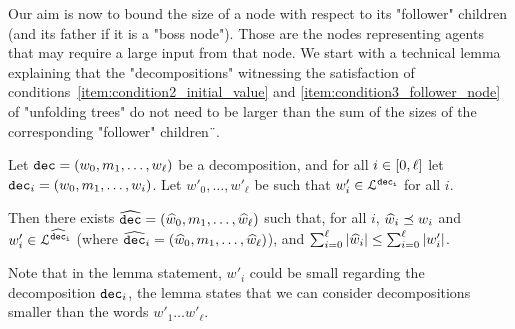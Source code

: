 

Our aim  is now to bound the size of a node with respect to its "follower" children (and its father if it is a "boss node"). Those are the nodes representing agents that may require a large input from that node. We start with a technical lemma explaining that the "decompositions" witnessing the satisfaction of conditions~\ref{item:condition2_initial_value} and \ref{item:condition3_follower_node} of "unfolding trees" do not need to be larger than the sum of the sizes of the corresponding "follower" children¨.

\begin{lemma}
	\label{lem:short-dec}
	Let $\mathtt{dec} = (w_0, m_1, \ldots, w_\ell)$ be a decomposition, and for all $i\in [0,\ell]$ let $\mathtt{dec}_i = (w_0, m_1, \ldots, w_i)$.
	Let $w'_0, \ldots, w'_\ell$ be such that $w'_i \in \mathcal{L}^{\mathtt{\mathtt{dec}_i}}$ for all $i$.
	
	Then there exists $\widehat{\mathtt{dec}} = (\widehat{w}_0, m_1, \ldots, \widehat{w}_\ell)$ such that, for all $i$, $\widehat{w}_i \preceq w_i$ and $w'_i \in \mathcal{L}^{\mathtt{\widehat{\mathtt{dec}}_i}}$ (where $\widehat{\mathtt{dec}}_i = (\widehat{w}_0, m_1, \ldots, \widehat{w}_\ell)$), and $\sum_{i=0}^{\ell} |\widehat{w}_i| \leq \sum_{i=0}^{\ell} |w'_i|$. 
\end{lemma}

Note that in the lemma statement, $w'_i$ could be small regarding the decomposition $\mathtt{dec}_i$, the lemma states that we can consider decompositions smaller than the words $w'_1 \dots w'_\ell$.

